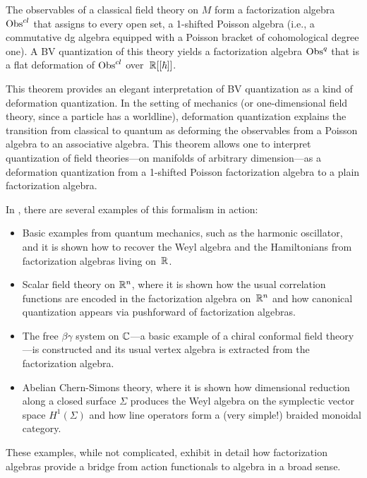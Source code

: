 \documentclass[11pt]{amsart}
\begin{document}
\begin{thm}
\label{main}
The observables of a classical field theory on $M$ form a factorization algebra ${\rm Obs}^{cl}$ that assigns to every open set, a 1-shifted Poisson algebra (i.e., a commutative dg algebra equipped with a Poisson bracket of cohomological degree one). A BV quantization of this theory yields a factorization algebra ${\rm Obs}^q$ that is a flat deformation of ${\rm Obs}^{cl}$ over~$\mathbb R[[\hbar]]$.
\end{thm}

This theorem provides an elegant interpretation of BV quantization as a kind of deformation quantization. In the setting of mechanics (or one-dimensional field theory, since a particle has a worldline), deformation quantization explains the transition from classical to quantum as deforming the observables from a Poisson algebra to an associative algebra. 
This theorem allows one to interpret quantization of field theories---on manifolds of arbitrary dimension---as a deformation quantization from a 1-shifted Poisson factorization algebra to a plain factorization algebra. 

In \cite{CG1}, there are several examples of this formalism in action:
\begin{itemize}
\item Basic examples from quantum mechanics, such as the harmonic oscillator, and it is shown how to recover the Weyl algebra and the Hamiltonians from factorization algebras living on~$\mathbb R$. 
\item Scalar field theory on $\mathbb R^n$, where it is shown how the usual correlation functions are encoded in the factorization algebra on~$\mathbb R^n$ and how canonical quantization appears via pushforward of factorization algebras.
\item The free $\beta\gamma$ system on $\mathbb C$---a basic example of a chiral conformal field theory---is constructed and its usual vertex algebra is extracted from the factorization algebra.
\item Abelian Chern-Simons theory, where it is shown how dimensional reduction along a closed surface $\Sigma$ produces the Weyl algebra on the symplectic vector space $H^1(\Sigma)$ and how line operators form a (very simple!) braided monoidal category.
\end{itemize}
These examples, while not complicated, exhibit in detail how factorization algebras provide a bridge from action functionals to algebra in a broad sense. 
\end{document}
